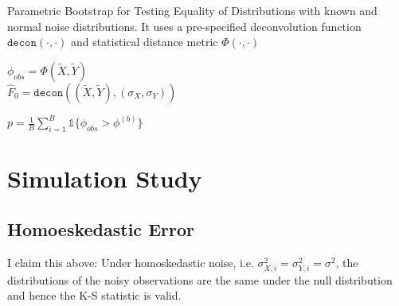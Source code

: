 \documentclass[12pt]{article}
\begin{document}
\begin{algorithm}[H]
\caption{Parametric Bootstrap for Testing Equality of Distributions with known and normal noise distributions. It uses a pre-specified deconvolution function $\texttt{decon}(\cdot, \cdot)$ and statistical distance metric $\Phi(\cdot, \cdot)$}
\label{deconv_boot_test}


 $\phi_{obs} = \Phi(\widetilde{X}, \widetilde{Y})$\\
 $\widehat{F}_0 = \texttt{decon}((\widetilde{X}, \widetilde{Y}), (\sigma_X, \sigma_Y))$

 $p = \frac{1}{B}\sum_{i = 1}^B {{\mathds{1}}\{\phi_{obs} > \phi^{(b)}\}}$

\end{algorithm}







\section{Simulation Study} %
\label{sec:simulation_study}


\subsection{Homoeskedastic Error} %
\label{sub:homoeskedastic_error}

I claim this above:
Under homoskedastic noise, i.e. $\sigma^2_{X,i} = \sigma^2_{Y,i} = \sigma^2$, the distributions of the noisy observations are the same under the null distribution and hence the K-S statistic is valid. 
\end{document}
